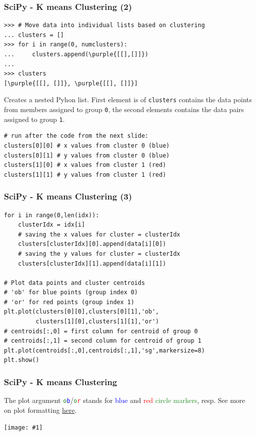 \documentclass[xcolor=svgnames]{beamer}
\newcommand{\red}[1]{\textcolor{red}{#1}}
\newcommand{\green}[1]{\textcolor{ForestGreen}{#1}}
\newcommand{\blue}[1]{{\textcolor{blue}{#1}}}
\newcommand{\purple}[1]{{\textcolor{purple}{#1}}}
\newcommand{\ipic}[2]{\texttt{[image: \#1]}}
\newcommand{\ft}[1]{\frametitle{#1}}
\begin{document}
\begin{frame}[fragile]\ft{SciPy -  K means Clustering (2)}
\begin{Verbatim}[xleftmargin=.1in, frame=single, commandchars=\\\{\}]
>>> # Move data into individual lists based on clustering
... clusters = []
>>> for i in range(0, numclusters):
...     clusters.append(\purple{[[],[]]})
... 
>>> clusters
[\purple{[[], []]}, \purple{[[], []]}]
\end{Verbatim}
Creates a nested Pyhon list.  First element is of {\tt clusters} contains the data points from members assigned to group {\tt 0}, the second elements contains the data pairs assigned to group {\tt 1}.  
\begin{Verbatim}[xleftmargin=.1in, frame=single]
# run after the code from the next slide:
clusters[0][0] # x values from cluster 0 (blue)
clusters[0][1] # y values from cluster 0 (blue)
clusters[1][0] # x values from cluster 1 (red)
clusters[1][1] # y values from cluster 1 (red)
\end{Verbatim}

\end{frame}


\begin{frame}[fragile]\ft{SciPy -  K means Clustering (3)}
\begin{Verbatim}[xleftmargin=.1in] 
for i in range(0,len(idx)):
    clusterIdx = idx[i]
    # saving the x values for cluster = clusterIdx
    clusters[clusterIdx][0].append(data[i][0])
    # saving the y values for cluster = clusterIdx
    clusters[clusterIdx][1].append(data[i][1])    

# Plot data points and cluster centroids
# 'ob' for blue points (group index 0)
# 'or' for red points (group index 1)
plt.plot(clusters[0][0],clusters[0][1],'ob',
    	 clusters[1][0],clusters[1][1],'or')
# centroids[:,0] = first column for centroid of group 0
# centroids[:,1] = second column for centroid of group 1
plt.plot(centroids[:,0],centroids[:,1],'sg',markersize=8)
plt.show()
\end{Verbatim}
\end{frame}


\begin{frame}\ft{SciPy - K means Clustering}
The plot argument {\tt \green{o}\blue b}/{\tt \green{o}\red r} stands for \blue{blue} and \red{red} \green{circle markers}, resp. See more on plot formatting \href{https://www.python-course.eu/matplotlib.php}{here}.
\begin{center}
\ipic{kmeans}{0.8}
\end{center}

\end{frame}
\end{document}
